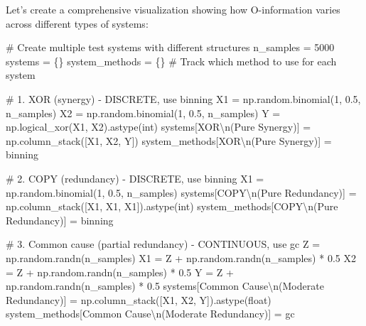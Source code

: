 \documentclass[
  11pt,
  letterpaper,
  oneside,
  openany]{book}
\newenvironment{Shaded}{\begin{snugshade}}{\end{snugshade}}
\newcommand{\BuiltInTok}[1]{\textcolor[rgb]{0.00,0.23,0.31}{#1}}
\newcommand{\CharTok}[1]{\textcolor[rgb]{0.13,0.47,0.30}{#1}}
\newcommand{\CommentTok}[1]{\textcolor[rgb]{0.37,0.37,0.37}{#1}}
\newcommand{\DecValTok}[1]{\textcolor[rgb]{0.68,0.00,0.00}{#1}}
\newcommand{\FloatTok}[1]{\textcolor[rgb]{0.68,0.00,0.00}{#1}}
\newcommand{\NormalTok}[1]{\textcolor[rgb]{0.00,0.23,0.31}{#1}}
\newcommand{\OperatorTok}[1]{\textcolor[rgb]{0.37,0.37,0.37}{#1}}
\newcommand{\StringTok}[1]{\textcolor[rgb]{0.13,0.47,0.30}{#1}}
\begin{document}
Let's create a comprehensive visualization showing how O-information
varies across different types of systems:

\begin{Shaded}
\begin{Highlighting}[]
\CommentTok{\# Create multiple test systems with different structures}
\NormalTok{n\_samples }\OperatorTok{=} \DecValTok{5000}
\NormalTok{systems }\OperatorTok{=}\NormalTok{ \{\}}
\NormalTok{system\_methods }\OperatorTok{=}\NormalTok{ \{\}  }\CommentTok{\# Track which method to use for each system}

\CommentTok{\# 1. XOR (synergy) {-} DISCRETE, use binning}
\NormalTok{X1 }\OperatorTok{=}\NormalTok{ np.random.binomial(}\DecValTok{1}\NormalTok{, }\FloatTok{0.5}\NormalTok{, n\_samples)}
\NormalTok{X2 }\OperatorTok{=}\NormalTok{ np.random.binomial(}\DecValTok{1}\NormalTok{, }\FloatTok{0.5}\NormalTok{, n\_samples)}
\NormalTok{Y }\OperatorTok{=}\NormalTok{ np.logical\_xor(X1, X2).astype(}\BuiltInTok{int}\NormalTok{)}
\NormalTok{systems[}\StringTok{\textquotesingle{}XOR}\CharTok{\textbackslash{}n}\StringTok{(Pure Synergy)\textquotesingle{}}\NormalTok{] }\OperatorTok{=}\NormalTok{ np.column\_stack([X1, X2, Y])}
\NormalTok{system\_methods[}\StringTok{\textquotesingle{}XOR}\CharTok{\textbackslash{}n}\StringTok{(Pure Synergy)\textquotesingle{}}\NormalTok{] }\OperatorTok{=} \StringTok{\textquotesingle{}binning\textquotesingle{}}

\CommentTok{\# 2. COPY (redundancy) {-} DISCRETE, use binning}
\NormalTok{X1 }\OperatorTok{=}\NormalTok{ np.random.binomial(}\DecValTok{1}\NormalTok{, }\FloatTok{0.5}\NormalTok{, n\_samples)}
\NormalTok{systems[}\StringTok{\textquotesingle{}COPY}\CharTok{\textbackslash{}n}\StringTok{(Pure Redundancy)\textquotesingle{}}\NormalTok{] }\OperatorTok{=}\NormalTok{ np.column\_stack([X1, X1, X1]).astype(}\BuiltInTok{int}\NormalTok{)}
\NormalTok{system\_methods[}\StringTok{\textquotesingle{}COPY}\CharTok{\textbackslash{}n}\StringTok{(Pure Redundancy)\textquotesingle{}}\NormalTok{] }\OperatorTok{=} \StringTok{\textquotesingle{}binning\textquotesingle{}}

\CommentTok{\# 3. Common cause (partial redundancy) {-} CONTINUOUS, use gc}
\NormalTok{Z }\OperatorTok{=}\NormalTok{ np.random.randn(n\_samples)}
\NormalTok{X1 }\OperatorTok{=}\NormalTok{ Z }\OperatorTok{+}\NormalTok{ np.random.randn(n\_samples) }\OperatorTok{*} \FloatTok{0.5}
\NormalTok{X2 }\OperatorTok{=}\NormalTok{ Z }\OperatorTok{+}\NormalTok{ np.random.randn(n\_samples) }\OperatorTok{*} \FloatTok{0.5}
\NormalTok{Y }\OperatorTok{=}\NormalTok{ Z }\OperatorTok{+}\NormalTok{ np.random.randn(n\_samples) }\OperatorTok{*} \FloatTok{0.5}
\NormalTok{systems[}\StringTok{\textquotesingle{}Common Cause}\CharTok{\textbackslash{}n}\StringTok{(Moderate Redundancy)\textquotesingle{}}\NormalTok{] }\OperatorTok{=}\NormalTok{ np.column\_stack([X1, X2, Y]).astype(}\BuiltInTok{float}\NormalTok{)}
\NormalTok{system\_methods[}\StringTok{\textquotesingle{}Common Cause}\CharTok{\textbackslash{}n}\StringTok{(Moderate Redundancy)\textquotesingle{}}\NormalTok{] }\OperatorTok{=} \StringTok{\textquotesingle{}gc\textquotesingle{}}


\end{Highlighting}
\end{Shaded}
\end{document}
